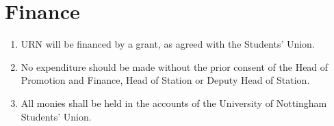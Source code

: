 \section{Finance}

\begin{enumerate}[label*=\thesection.\arabic*.]
    \item URN will be financed by a grant, as agreed with the Students' Union.
    \item No expenditure should be made without the prior consent of the Head of Promotion and Finance, Head of Station or Deputy Head of Station.
    \item All monies shall be held in the accounts of the University of Nottingham Students' Union.
\end{enumerate}
